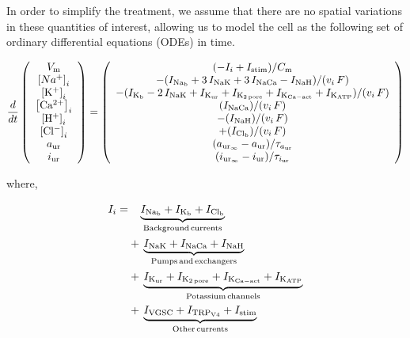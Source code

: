 In order to simplify the treatment, we assume that there are no
spatial variations in these quantities of interest, allowing us to
model the cell as the following set of ordinary differential equations
(ODEs) in time.

\begin{equation}
  \frac{d}{dt}
  \left(
    \begin{array}{c}
      V_{\rm m}\\
      \left[Na^{+}\right]_{i}\\
      \left[\rm K^{+}\right]_{i}\\
      \left[\rm Ca^{2+}\right]_{i}\\
      \left[\rm H^{+}\right]_{i}\\
      \left[\rm Cl^{-}\right]_{i}\\
      a_{\rm ur}\\
      i_{\rm ur}\\
    \end{array}
  \right)  = \left(
    \begin{array}{c}
        (-I_{i} + I_{\rm stim})/{C_{\rm m}}\\
      - (I_{\rm Na_{b}} + 3\, I_{\rm NaK} + 3\, I_{\rm NaCa} - I_{\rm
        NaH})/(v_{i}\, F)\\
      - (I_{\rm K_{b}} - 2\, I_{\rm NaK} + I_{\rm K_{ur}} + I_{\rm
        K_{2\, pore}} + I_{\rm K_{Ca-act}} + I_{\rm K_{ATP}})/(v_{i}\,
      F)\\
        (I_{\rm NaCa})/(v_{i}\, F)\\
      - (I_{\rm NaH})/(v_{i}\, F)\\
      + (I_{\rm Cl_{b}})/(v_{i}\, F)\\
      (a_{{\rm ur}_{\infty}} - a_{\rm ur})/\tau_{a_{\rm ur}}\\
      (i_{{\rm ur}_{\infty}} - i_{\rm ur})/\tau_{i_{\rm ur}}\\
    \end{array}
  \right)
\end{equation}

\noindent where,

\begin{equation*}
    \begin{split}
      I_{i} =
      & \phantom{+\,} \underbrace{I_{\rm Na_b} + I_{\rm K_b} + I_{\rm Cl_b}}_{\rm
        Background\, currents}\\
      & +\, \underbrace{I_{\rm NaK} + I_{\rm NaCa} + I_{\rm NaH}}_{\rm
        Pumps\, and\, exchangers}\\
      & +\, \underbrace{I_{\rm K_{ur}} + I_{\rm K_{2\, pore}} + I_{\rm
          K_{Ca-act}} + I_{\rm K_{ATP}}}_{\rm Potassium\, channels}\\
      & +\, \underbrace{I_{\rm VGSC} + I_{\rm TRP_{V4}} + I_{\rm
          stim}}_{\rm Other\, currents}
    \end{split}
\end{equation*}

